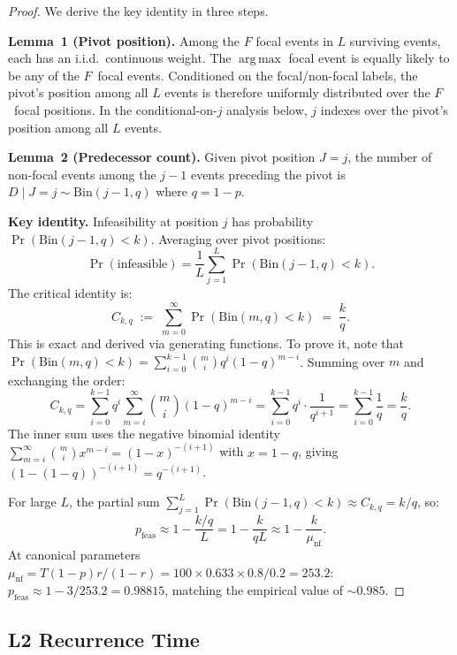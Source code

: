 \documentclass[11pt]{article}
\theoremstyle{plain}
\theoremstyle{definition}
\theoremstyle{remark}
\newcommand{\pfeas}{{p_{\mathrm{feas}}}}
\DeclareMathOperator*{\argmax}{arg\,max}
\begin{document}
\begin{proof}
We derive the key identity in three steps.

\textbf{Lemma~1 (Pivot position).}  Among the $F$ focal events in
$L$ surviving events, each has an i.i.d.\ continuous weight.  The
$\argmax$ focal event is equally likely to be any of the $F$~focal
events.  Conditioned on the focal/non-focal labels, the pivot's
position among all $L$ events is therefore uniformly distributed
over the $F$~focal positions.  In the conditional-on-$j$ analysis
below, $j$ indexes over the pivot's position among all $L$ events.

\textbf{Lemma~2 (Predecessor count).}  Given pivot position $J = j$,
the number of non-focal events among the $j-1$ events preceding the
pivot is $D \mid J{=}j \sim \mathrm{Bin}(j-1, q)$ where $q = 1-p$.

\textbf{Key identity.}  Infeasibility at position $j$ has probability
$\Pr(\mathrm{Bin}(j-1, q) < k)$.  Averaging over pivot positions:
\[
  \Pr(\text{infeasible}) = \frac{1}{L} \sum_{j=1}^{L}
  \Pr(\mathrm{Bin}(j-1, q) < k).
\]
The critical identity is:
\begin{equation}\label{eq:ckq}
  C_{k,q} \;:=\; \sum_{m=0}^{\infty} \Pr(\mathrm{Bin}(m, q) < k)
  \;=\; \frac{k}{q}.
\end{equation}
This is exact and derived via generating functions.  To prove it,
note that $\Pr(\mathrm{Bin}(m,q) < k) = \sum_{i=0}^{k-1} \binom{m}{i}
q^i (1-q)^{m-i}$.  Summing over $m$ and exchanging the order:
\[
  C_{k,q} = \sum_{i=0}^{k-1} q^i \sum_{m=i}^{\infty} \binom{m}{i}
  (1-q)^{m-i}
  = \sum_{i=0}^{k-1} q^i \cdot \frac{1}{q^{i+1}}
  = \sum_{i=0}^{k-1} \frac{1}{q}
  = \frac{k}{q}.
\]
The inner sum uses the negative binomial identity
$\sum_{m=i}^{\infty} \binom{m}{i} x^{m-i} = (1-x)^{-(i+1)}$ with
$x = 1-q$, giving $(1-(1-q))^{-(i+1)} = q^{-(i+1)}$.

For large $L$, the partial sum
$\sum_{j=1}^{L} \Pr(\mathrm{Bin}(j-1,q) < k) \approx C_{k,q} = k/q$,
so:
\[
  \pfeas \approx 1 - \frac{k/q}{L} = 1 - \frac{k}{qL}
  \approx 1 - \frac{k}{\mu_{\mathrm{nf}}}.
\]
At canonical parameters $\mu_{\mathrm{nf}} = T(1-p)r/(1-r) =
100 \times 0.633 \times 0.8 / 0.2 = 253.2$:
$\pfeas \approx 1 - 3/253.2 = 0.98815$, matching the empirical value
of ${\sim}0.985$.
\end{proof}

\subsection{L2 Recurrence Time}
\end{document}
